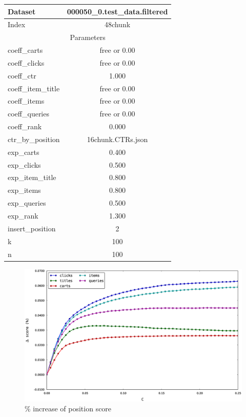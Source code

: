 \documentclass{article}
\begin{document}
\begin{center}
    \begin{tabular}{| l | c |}
        \hline
        Dataset & 000050\_0.test\_data.filtered \\ \hline
        Index & 48chunk \\ \hline
        \hline
        \multicolumn{2}{|c|}{Parameters} \\ \hline
        coeff\_carts & free or 0.00 \\ \hline
        coeff\_clicks & free or 0.00 \\ \hline
        coeff\_ctr & 1.000 \\ \hline
        coeff\_item\_title & free or 0.00 \\ \hline
        coeff\_items & free or 0.00 \\ \hline
        coeff\_queries & free or 0.00 \\ \hline
        coeff\_rank & 0.000 \\ \hline
        ctr\_by\_position & 16chunk.CTRs.json \\ \hline
        exp\_carts & 0.400 \\ \hline
        exp\_clicks & 0.500 \\ \hline
        exp\_item\_title & 0.800 \\ \hline
        exp\_items & 0.800 \\ \hline
        exp\_queries & 0.500 \\ \hline
        exp\_rank & 1.300 \\ \hline
        insert\_position & 2 \\ \hline
        k & 100 \\ \hline
        n & 100 \\ \hline
  \end{tabular}
\end{center}

\begin{figure}[htbp!]
\centering
\includegraphics[width=\textwidth]{000050_0.48chunk.k100.i2.n100.percent_increase_position_score.0-0.25.eps}
\caption{\% increase of position score}
    \label{fig:percent_increase_of_position_score}
\end{figure}
\end{document}

